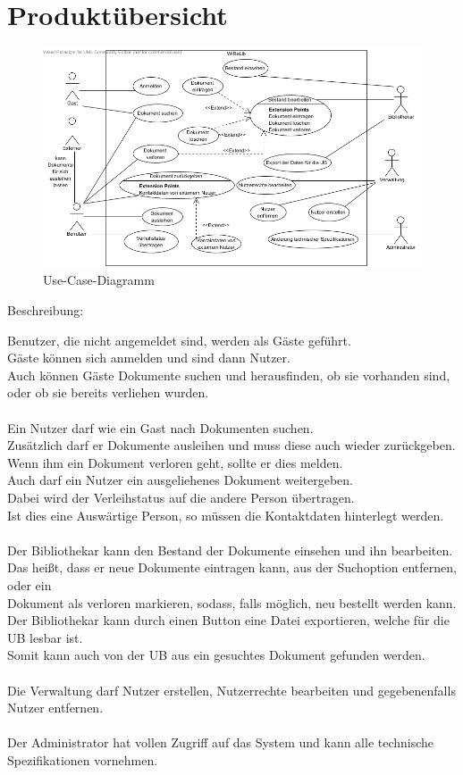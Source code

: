 \chapter{Produktübersicht}

\begin{figure}[h]
\centering
\includegraphics[width=0.8\linewidth]{bilder/use-case.png}
\caption[Use-Case-Diagramm]{Use-Case-Diagramm}
\end{figure}


Beschreibung:

Benutzer, die nicht angemeldet sind, werden als Gäste geführt.\\
Gäste können sich anmelden und sind dann Nutzer. \\
Auch können Gäste Dokumente suchen und herausfinden, ob sie vorhanden sind, oder ob sie bereits verliehen wurden.\\
\\
Ein Nutzer darf wie ein Gast nach Dokumenten suchen.\\
Zusätzlich darf er Dokumente ausleihen und muss diese auch wieder zurückgeben.\\
Wenn ihm ein Dokument verloren geht, sollte er dies melden.\\
Auch darf ein Nutzer ein ausgeliehenes Dokument weitergeben.\\
Dabei wird der Verleihstatus auf die andere Person übertragen.\\
Ist dies eine Auswärtige Person, so müssen die Kontaktdaten hinterlegt werden.\\
\\
Der Bibliothekar kann den Bestand der Dokumente einsehen und ihn bearbeiten.\\
Das heißt, dass er neue Dokumente eintragen kann, aus der Suchoption entfernen, oder ein\\
Dokument als verloren markieren, sodass, falls möglich, neu bestellt werden kann.\\
Der Bibliothekar kann durch einen Button eine Datei exportieren, welche für die UB lesbar ist.\\
Somit kann auch von der UB aus ein gesuchtes Dokument gefunden werden.\\
\\
Die Verwaltung darf Nutzer erstellen, Nutzerrechte bearbeiten und gegebenenfalls Nutzer entfernen.\\
\\
Der Administrator hat vollen Zugriff auf das System und kann alle technische Spezifikationen vornehmen.\\